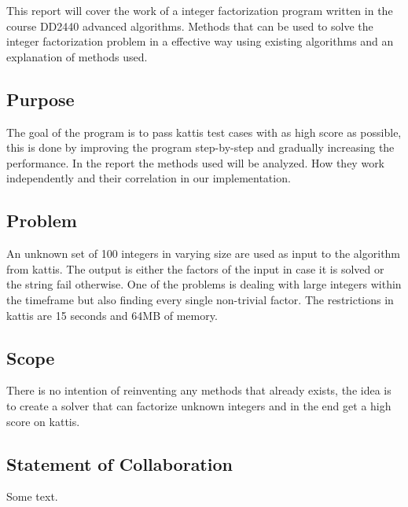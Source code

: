 This report will cover the work of a integer factorization program written in the course DD2440 advanced algorithms. Methods that can be used to solve the integer factorization problem in a effective way using existing algorithms and an explanation of methods used.

\subsection{Purpose}
The goal of the program is to pass kattis test cases with as high score as possible, this is done by improving the program step-by-step and gradually increasing the performance. In the report the methods used will be analyzed. How they work independently and their correlation in our implementation.

\subsection{Problem}
An unknown set of 100 integers in varying size are used as input to the algorithm from kattis. The output is either the factors of the input in case it is solved or the string fail otherwise. One of the problems is dealing with large integers within the timeframe but also finding every single non-trivial factor. The restrictions in kattis are 15 seconds and 64MB of memory.

\subsection{Scope}
There is no intention of reinventing any methods that already exists, the idea is to create a solver that can factorize unknown integers and in the end get a high score on kattis.

\subsection{Statement of Collaboration}
Some text.